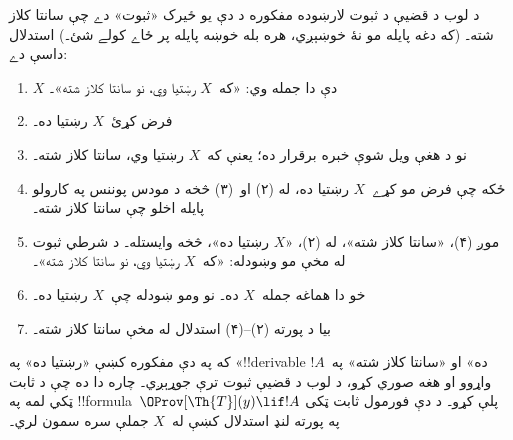 \documentclass[../../../include/open-logic-section]{subfiles}
\begin{document}
\begin{explain}
د لوب د قضيې د ثبوت لارښوده مفکوره د دې يو ځيرک «ثبوت» دے چې
سانتا کلاز شته۔ (که دغه پايله مو نۀ خوښېږي، هره بله خوښه پايله
پر ځاے کولے شئ۔) استدلال داسې دے:
\begin{enumerate}
\item $X$ دې دا جمله وي: «که~$X$ رښتيا وي، نو سانتا کلاز شته»۔
\item فرض کړئ~$X$ رښتيا ده۔
\item نو د هغې ويل شوې خبره برقرار ده؛ يعنې که~$X$ رښتيا وي،
  سانتا کلاز شته۔
\item ځکه چې فرض مو کړے~$X$ رښتيا ده، له (۲) او~(۳) څخه د
  مودس پوننس په کارولو پايله اخلو چې سانتا کلاز شته۔
\item موږ (۴)، «سانتا کلاز شته»، له (۲)، «$X$ رښتيا ده»، څخه
  وايستله۔ د شرطي ثبوت له مخې مو وښودله: «که~$X$ رښتيا وي، نو
  سانتا کلاز شته»۔
\item خو دا هماغه جمله~$X$ ده۔ نو ومو ښودله چې~$X$ رښتيا ده۔
\item بيا د پورته (۲)--(۴) استدلال له مخې سانتا کلاز شته۔
\end{enumerate}
که په دې مفکوره کښې «رښتيا ده» په «!!{derivable} ده» او «سانتا
کلاز شته» په~$!A$ واړوو او هغه صوري کړو، د لوب د قضيې ثبوت
ترې جوړېږي۔ چاره دا ده چې د ثابت ټکي لمه په
!!{formula}~$\OProv[\Th{T}](y) \lif !A$ پلې کړو۔ د دې فورمول
ثابت ټکی په پورته لنډ استدلال کښې له~$X$ جملې سره سمون لري۔
\end{explain}
\end{document}
